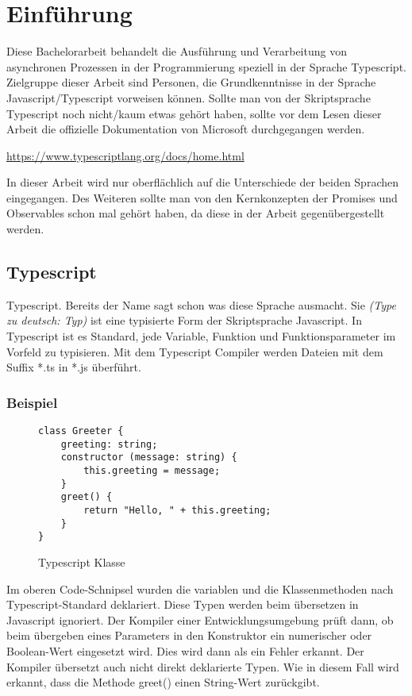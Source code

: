 \setcounter{secnumdepth}{1}
\section{Einführung}
Diese Bachelorarbeit behandelt die Ausführung und Verarbeitung von asynchronen Prozessen in der Programmierung speziell in der Sprache Typescript.\\
Zielgruppe dieser Arbeit sind Personen, die Grundkenntnisse in der Sprache Javascript/Typescript vorweisen können.
Sollte man von der Skriptsprache Typescript noch nicht/kaum etwas gehört haben, sollte vor dem Lesen dieser Arbeit die offizielle Dokumentation von Microsoft durchgegangen werden.

\begin{center}
\url{https://www.typescriptlang.org/docs/home.html} 
\end{center}

In dieser Arbeit wird nur oberflächlich auf die Unterschiede der beiden Sprachen eingegangen. Des Weiteren sollte man von den Kernkonzepten der Promises und Observables schon mal gehört haben, da diese in der Arbeit gegenübergestellt werden.

\subsection{Typescript}
Typescript. Bereits der Name sagt schon was diese Sprache ausmacht. Sie \textit{(\glqq{}Type\grqq{} zu deutsch: Typ)} ist eine typisierte Form der Skriptsprache Javascript. In Typescript ist es Standard, jede Variable, Funktion und Funktionsparameter im Vorfeld zu typisieren. Mit dem Typescript Compiler werden Dateien mit dem Suffix *.ts in *.js überführt.

\subsubsection{Beispiel}

\begin{figure}[h!]
\begin{lstlisting}
class Greeter {
    greeting: string;
    constructor (message: string) {
        this.greeting = message;
    }
    greet() {
        return "Hello, " + this.greeting;
    }
}  
\end{lstlisting}
\caption{Typescript Klasse \cite{typescript-example}}
\end{figure}

Im oberen Code-Schnipsel wurden die variablen und die Klassenmethoden nach Typescript-Standard deklariert. Diese Typen werden beim übersetzen in Javascript ignoriert. Der Kompiler einer Entwicklungsumgebung prüft dann, ob beim übergeben eines Parameters in den Konstruktor ein numerischer oder Boolean-Wert eingesetzt wird. Dies wird dann als ein Fehler erkannt. Der Kompiler übersetzt auch nicht direkt deklarierte Typen. Wie in diesem Fall wird erkannt, dass die Methode greet() einen String-Wert zurückgibt.

